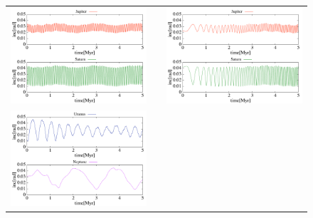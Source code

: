 \documentclass[11pt,a4paper,oneside,onecolumn]{jarticle}
\begin{document}
\begin{figure}[H]
\begin{tabular}{ccc}
\begin{minipage}[t]{0.45\hsize}
\centering
\includegraphics[width=8cm]{./image/NoMove_inc_5Myr_JUPSAT.pdf}
\end{minipage} &
\begin{minipage}[t]{0.1\hsize}
\end{minipage} &
\begin{minipage}[t]{0.45\hsize}
\centering
\includegraphics[width=8cm]{./image/Move500kyr_inc_5Myr_JUPSAT.pdf}
\end{minipage}\\
\begin{minipage}[t]{0.45\hsize}
\centering
\includegraphics[width=8cm]{./image/NoMove_inc_5Myr_URANEP.pdf}
\end{minipage} &

\end{tabular}
\end{figure}
\end{document}
